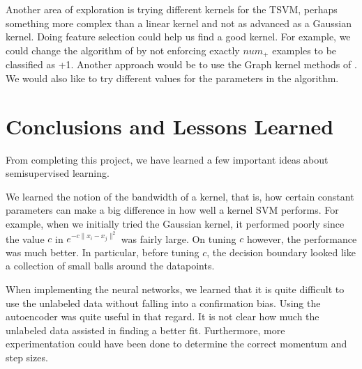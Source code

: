 \documentclass[11pt]{article}
\begin{document}
Another area of exploration is trying different kernels for the TSVM, perhaps something more complex than a linear kernel and not as advanced as a Gaussian kernel. Doing feature selection could help us find a good kernel. For example, we could change the algorithm of \cite{Joachims:1999} by not enforcing exactly $num_+$ examples to be classified as +1. Another approach would be to use the Graph kernel methods of \cite{smola2003kernels}. We would also like to try different values for the parameters in the algorithm.

\section{Conclusions and Lessons Learned}

From completing this project, we have learned a few important ideas about semisupervised learning. 



We learned the notion of the bandwidth of a kernel, that is,
how certain constant parameters can make a big difference in how well
a kernel SVM performs. For example, when we initially tried the
Gaussian kernel, it performed poorly since the value
$c$ in $e^{-c\|x_i-x_j\|^2}$ was fairly large.
On tuning $c$ however, the performance was much better. In particular,
before tuning $c$, the decision boundary looked like a collection of
small balls around the datapoints.

When implementing the neural networks, we learned that it is quite difficult to use the unlabeled data without falling into a confirmation bias. Using the autoencoder was quite useful in that regard. It is not clear how much the unlabeled data assisted in finding a better fit. Furthermore, more experimentation could have been done to determine the correct momentum and step sizes.



\end{document}
